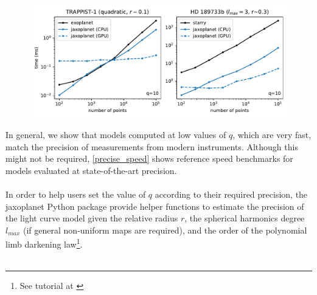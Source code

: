 \documentclass[modern]{aastex631}
\begin{document}
\begin{figure}[H]
    \begin{center}
        \includegraphics[width=\textwidth]{../workflows/speed/figures/speed_vs_N_realistic.pdf}
        \caption{}
        \label{fig:real_benchmark}
    \end{center}
\end{figure}

In general, we show that models computed at low values of $q$, which are very fast, match the precision of measurements from modern instruments. Although this might not be required, \autoref{precise_speed} shows reference speed benchmarks for models evaluated at state-of-the-art precision.\\\\
In order to help users set the value of $q$ according to their required precision, the \textsf{jaxoplanet} Python package provide helper functions to estimate the precision of the light curve model given the relative radius $r$, the spherical harmonics degree $l_{max}$ (if general non-uniform maps are required), and the order of the polynomial limb darkening law\footnote{See tutorial at \href{}{}}.\\\\
\end{document}
